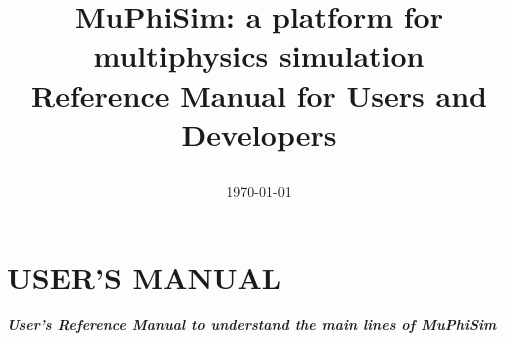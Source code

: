 \documentclass[oneside,11pt,times]{book}
\title{\Large{\textbf{MuPhiSim:} a platform for multiphysics simulation\\[10mm] Reference Manual for Users and Developers\\[6mm]}
\author{
}
\date{\today}
}
\begin{document}
\maketitle



\tableofcontents

\chapter{USER'S MANUAL}
\begin{center}
    \Large
    \textbf{\textit{User's Reference Manual to understand the main lines of MuPhiSim }}
\end{center}
\end{document}
